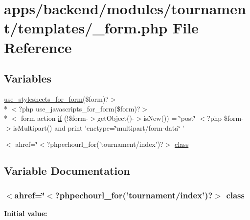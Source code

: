 \hypertarget{backend_2modules_2tournament_2templates_2__form_8php}{\section{apps/backend/modules/tournament/templates/\-\_\-form.php File Reference}
\label{backend_2modules_2tournament_2templates_2__form_8php}
}
\subsection*{Variables}
\begin{DoxyCompactItemize}
\item 
\hyperlink{live_2modules_2user_2templates_2__form_8php_a86bc4522fdbe625b07bc4a4d6eec3df7}{use\-\_\-stylesheets\-\_\-for\-\_\-form}(\$form)?$>$\\*
$<$?php use\-\_\-javascripts\-\_\-for\-\_\-form(\$form)?$>$\\*
$<$ form action \hyperlink{backend_2modules_2tournament_2templates_2__form_8php_ae30a307b320d8da5d9a945eaf68f7549}{if} (!\$form-\/$>$get\-Object()-\/$>$is\-New()) = \char`\"{}post\char`\"{} $<$?php \$form-\/$>$is\-Multipart() and print 'enctype=\char`\"{}multipart/form-\/data\char`\"{} '
\item 
$<$ ahref=\char`\"{}$<$?phpechourl\-\_\-for('tournament/index')?$>$ \hyperlink{backend_2modules_2tournament_2templates_2__form_8php_a9d36065e4b03ab08e2547eb79ebc4e2b}{class}
\end{DoxyCompactItemize}


\subsection{Variable Documentation}
\hypertarget{backend_2modules_2tournament_2templates_2__form_8php_a9d36065e4b03ab08e2547eb79ebc4e2b}{
\subsubsection[{class}]{\setlength{\rightskip}{0pt plus 5cm}$<$ahref=\char`\"{}$<$?phpechourl\-\_\-for('tournament/index')?$>$ class}}\label{backend_2modules_2tournament_2templates_2__form_8php_a9d36065e4b03ab08e2547eb79ebc4e2b}
{\bfseries Initial value\-:}


